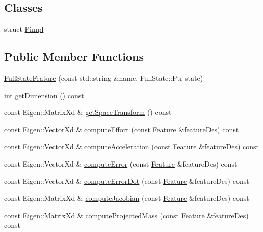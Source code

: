 \subsection*{Classes}
\begin{DoxyCompactItemize}
\item 
struct \hyperlink{structocra_1_1FullStateFeature_1_1Pimpl}{Pimpl}
\end{DoxyCompactItemize}
\subsection*{Public Member Functions}
\begin{DoxyCompactItemize}
\item 
\hyperlink{classocra_1_1FullStateFeature_a58460a5615fefc0b12b5a04767ea2386}{Full\+State\+Feature} (const std\+::string \&name, Full\+State\+::\+Ptr state)
\item 
int \hyperlink{classocra_1_1FullStateFeature_a62b4a9dd7055ab47105c8aefaa45611a}{get\+Dimension} () const
\item 
const Eigen\+::\+Matrix\+Xd \& \hyperlink{classocra_1_1FullStateFeature_a2f6672c0d5a13df8fc4f38f011c8c32e}{get\+Space\+Transform} () const
\item 
const Eigen\+::\+Vector\+Xd \& \hyperlink{classocra_1_1FullStateFeature_aac81e14af36ee0fb2ff24f991a1915eb}{compute\+Effort} (const \hyperlink{classocra_1_1Feature}{Feature} \&feature\+Des) const
\item 
const Eigen\+::\+Vector\+Xd \& \hyperlink{classocra_1_1FullStateFeature_a1ca39e66ea07182b46ba7e60477efb17}{compute\+Acceleration} (const \hyperlink{classocra_1_1Feature}{Feature} \&feature\+Des) const
\item 
const Eigen\+::\+Vector\+Xd \& \hyperlink{classocra_1_1FullStateFeature_ab1b5ffc62eba180926f7b90e6318ee6f}{compute\+Error} (const \hyperlink{classocra_1_1Feature}{Feature} \&feature\+Des) const
\item 
const Eigen\+::\+Vector\+Xd \& \hyperlink{classocra_1_1FullStateFeature_a0d3e5b76bdcae8e06df07c7f525ad690}{compute\+Error\+Dot} (const \hyperlink{classocra_1_1Feature}{Feature} \&feature\+Des) const
\item 
const Eigen\+::\+Matrix\+Xd \& \hyperlink{classocra_1_1FullStateFeature_abcd0254d7836bea5531d49afff872d20}{compute\+Jacobian} (const \hyperlink{classocra_1_1Feature}{Feature} \&feature\+Des) const
\item 
const Eigen\+::\+Matrix\+Xd \& \hyperlink{classocra_1_1FullStateFeature_a40f68dad4e231a19b6566fa6829b8f90}{compute\+Projected\+Mass} (const \hyperlink{classocra_1_1Feature}{Feature} \&feature\+Des) const

\end{DoxyCompactItemize}
